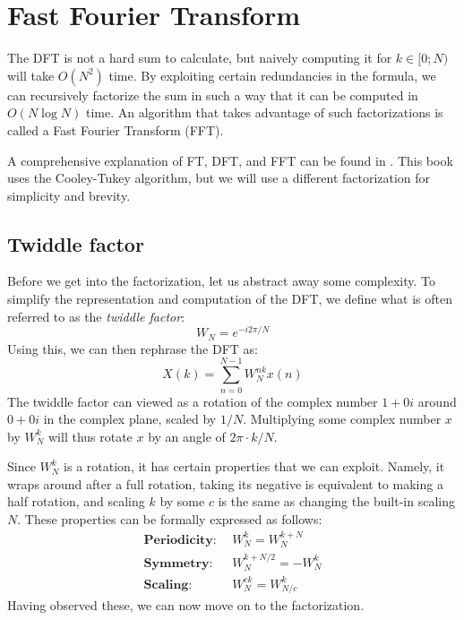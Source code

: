 \section{Fast Fourier Transform}
The DFT is not a hard sum to calculate,
but naively computing it for $k \in [0;N)$ will take $O(N^2)$ time.
By exploiting certain redundancies in the formula,
we can recursively factorize the sum in such a way that it can be computed in $O(N \log N)$ time.
An algorithm that takes advantage of such factorizations is called a Fast Fourier Transform (FFT).

A comprehensive explanation of FT, DFT, and FFT can be found in \cite{brunton}.
This book uses the Cooley-Tukey algorithm,
but we will use a different factorization for simplicity and brevity.

\subsection{Twiddle factor}
Before we get into the factorization, let us abstract away some complexity.
To simplify the representation and computation of the DFT,
we define what is often referred to as the \textit{twiddle factor}:
\begin{equation}
    W_N = e^{-i 2 \pi / N}
\end{equation}
Using this, we can then rephrase the DFT as:
\begin{equation}
    X(k) = \sum_{n = 0}^{N - 1} W_N^{nk} x(n)
\end{equation}
%
The twiddle factor can viewed as a rotation of the complex number $1 + 0i$
around $0 + 0i$ in the complex plane, scaled by $1/N$.
Multiplying some complex number $x$ by $W_N^k$
will thus rotate $x$ by an angle of $2 \pi \cdot k/N$.

Since $W_N^k$ is a rotation,
it has certain properties that we can exploit.
Namely, it wraps around after a full rotation,
taking its negative is equivalent to making a half rotation,
and scaling $k$ by some $c$ is the same as changing the built-in scaling $N$.
These properties can be formally expressed as follows:
\begin{align}
    \textbf{Periodicity:} &~~W^k_N = W^{k + N}_N\\
    \textbf{Symmetry:}    &~~W^{k + N/2}_N = -W^k_N\\
    \textbf{Scaling:}     &~~W_N^{ck} = W_{N/c}^{k}
\end{align}
Having observed these, we can now move on to the factorization.

